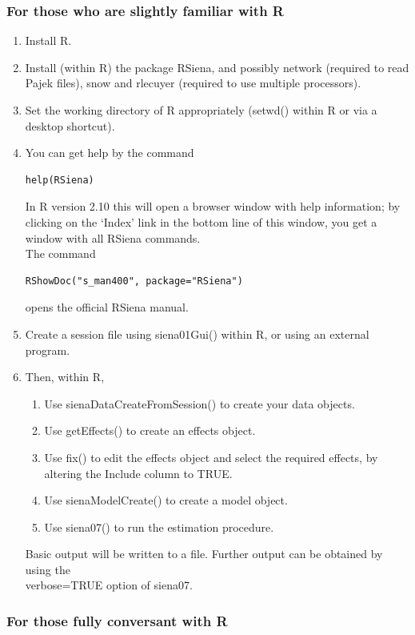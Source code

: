 \documentclass[a4paper,fleqn]{article}
\newcommand{\+}{\, + \,}
\newcommand{\sfn}[1]{\textsf{#1}}
\newcommand{\R}{{\sf R }}
\newcommand{\Rn}{{\sf R}}
\newcommand{\rs}{{\sf RSiena}}
\newcommand{\RS}{{\sf RSiena }}
\begin{document}
{\smallskip

\subsubsection{For those who are slightly familiar with \Rn}
\label{S_slightlyR}

\begin{enumerate}
\item Install \Rn.
\item Install (within \Rn) the package \rs, and
  possibly \sfn{network} (required to read Pajek files), \sfn{snow} and
  \sfn{rlecuyer} (required to use multiple processors).
\item Set the working directory of \R appropriately (\sfn{setwd()} within \Rn
 or via a desktop shortcut).
\item You can get help by the command
\begin{verbatim}
help(RSiena)
\end{verbatim}
      In \R version 2.10 this will open a browser window with help information;
      by clicking on the `Index' link in the bottom line of this window,
      you get a window with all  \RS commands.\\
      The command
\begin{verbatim}
RShowDoc("s_man400", package="RSiena")
\end{verbatim}
      opens the official \RS manual.
\item Create a session file using \sfn{siena01Gui()} within \Rn, or using an
  external program.
\item Then, within \Rn,
\begin{enumerate}
\item Use \sfn{sienaDataCreateFromSession()} to create your data objects.
\item Use \sfn{getEffects()} to create an effects object.
\item Use \sfn{fix()} to edit the effects object and select the required
  effects, by altering the \sfn{Include} column to \sfn{TRUE}.
\item Use \sfn{sienaModelCreate()} to create a model object.
\item Use \sfn{siena07()} to run the estimation procedure.
\end{enumerate}
Basic output will be written to a file. Further output can be obtained by using
the\\ \sfn{verbose=TRUE} option of \sfn{siena07}.
\end{enumerate}
\subsubsection{For those fully conversant with \Rn}

}
\end{document}
